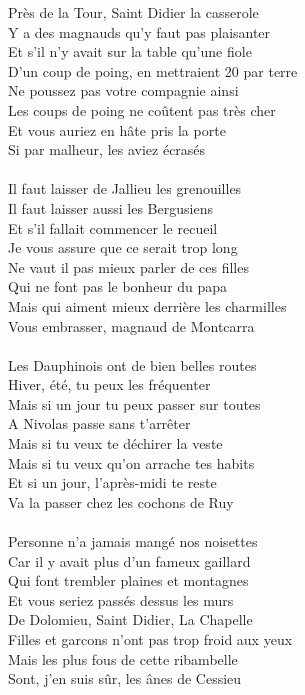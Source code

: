 \breakpage
Près de la Tour, Saint Didier la casserole
\\Y a des magnauds qu'y faut pas plaisanter
\\Et s'il n'y avait sur la table qu'une fiole
\\D'un coup de poing, en mettraient 20 par terre
\\Ne poussez pas votre compagnie ainsi
\\Les coups de poing ne coûtent pas très cher
\\Et vous auriez en hâte pris la porte
\\Si par malheur, les aviez écrasés
\\\\Il faut laisser de Jallieu les grenouilles
\\Il faut laisser aussi les Bergusiens
\\Et s'il fallait commencer le recueil
\\Je vous assure que ce serait trop long
\\Ne vaut il pas mieux parler de ces filles
\\Qui ne font pas le bonheur du papa
\\Mais qui aiment mieux derrière les charmilles
\\Vous embrasser, magnaud de Montcarra
\\\\Les Dauphinois ont de bien belles routes
\\Hiver, été, tu peux les fréquenter
\\Mais si un jour tu peux passer sur toutes
\\A Nivolas passe sans t'arrêter
\\Mais si tu veux te déchirer la veste
\\Mais si tu veux qu'on arrache tes habits
\\Et si un jour, l'après-midi te reste
\\Va la passer chez les cochons de Ruy
\\\\Personne n'a jamais mangé nos noisettes
\\Car il y avait plus d'un fameux gaillard
\\Qui font trembler plaines et montagnes
\\Et vous seriez passés dessus les murs
\\De Dolomieu, Saint Didier, La Chapelle
\\Filles et garcons n'ont pas trop froid aux yeux
\\Mais les plus fous de cette ribambelle
\\Sont, j'en suis sûr, les ânes de Cessieu
\breakpage